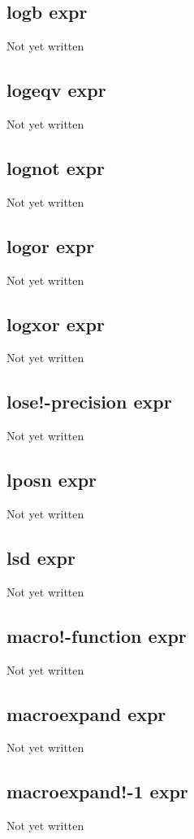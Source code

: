 \documentclass[a4paper,11pt]{article}
\begin{document}
{\subsection{\ttfamily logb expr}
Not yet written

\subsection{\ttfamily logeqv expr}
Not yet written

\subsection{\ttfamily lognot expr}
Not yet written

\subsection{\ttfamily logor expr}
Not yet written

\subsection{\ttfamily logxor expr}
Not yet written

\subsection{\ttfamily lose!-precision expr}
Not yet written

\subsection{\ttfamily lposn expr}
Not yet written

\subsection{\ttfamily lsd expr}
Not yet written

\subsection{\ttfamily macro!-function expr}
Not yet written

\subsection{\ttfamily macroexpand expr}
Not yet written

\subsection{\ttfamily macroexpand!-1 expr}
Not yet written

}
\end{document}
